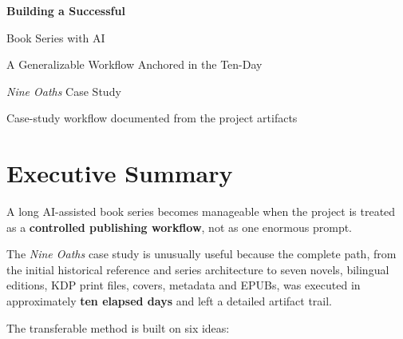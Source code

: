 \documentclass[11pt,oneside,openany]{book}
\begin{document}
\frontmatter
\begin{titlepage}
  \pagecolor{guideCream}
  \centering
  \vspace*{24mm}
  {\sffamily\bfseries\fontsize{30}{34}\selectfont\color{guideNavy} Building a Successful\par Book Series with AI\par}
  \vspace{7mm}
  {\sffamily\Large\color{guideTeal} A Generalizable Workflow Anchored in the Ten-Day\par \textit{Nine Oaths} Case Study\par}
  \vfill
  \vfill
  {\sffamily\small\color{guideGray} Case-study workflow documented from the project artifacts\par}
  \vspace{10mm}
\end{titlepage}
\nopagecolor
\tableofcontents
\clearpage
\mainmatter
\chapter*{Executive Summary}\label{executive-summary}

A long AI-assisted book series becomes manageable when the project is treated as a \textbf{controlled publishing workflow}, not as one enormous prompt.

The \emph{Nine Oaths} case study is unusually useful because the complete path, from the initial historical reference and series architecture to seven novels, bilingual editions, KDP print files, covers, metadata and EPUBs, was executed in approximately \textbf{ten elapsed days} and left a detailed artifact trail.

The transferable method is built on six ideas:
\end{document}
